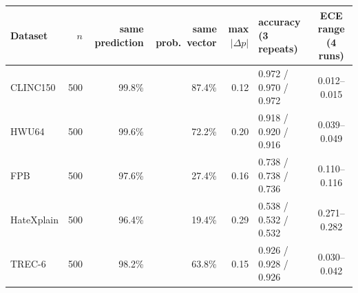 \begin{tabular}{lrrrrlc}
\toprule
Dataset & $n$ & same prediction & same prob.\ vector & max $|\Delta p|$ & accuracy (3 repeats) & ECE range (4 runs) \\
\midrule
CLINC150 & 500 & 99.8\% & 87.4\% & 0.12 & 0.972 / 0.970 / 0.972 & 0.012--0.015 \\
HWU64 & 500 & 99.6\% & 72.2\% & 0.20 & 0.918 / 0.920 / 0.916 & 0.039--0.049 \\
FPB & 500 & 97.6\% & 27.4\% & 0.16 & 0.738 / 0.738 / 0.736 & 0.110--0.116 \\
HateXplain & 500 & 96.4\% & 19.4\% & 0.29 & 0.538 / 0.532 / 0.532 & 0.271--0.282 \\
TREC-6 & 500 & 98.2\% & 63.8\% & 0.15 & 0.926 / 0.928 / 0.926 & 0.030--0.042 \\
\bottomrule
\end{tabular}
